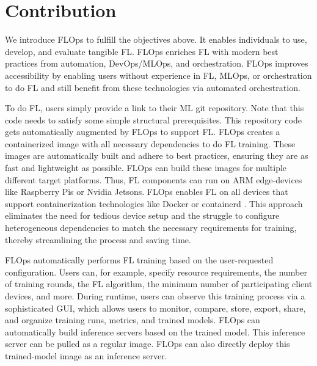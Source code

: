 
\section{Contribution}

We introduce FLOps to fulfill the objectives above.
It enables individuals to use, develop, and evaluate tangible FL.
FLOps enriches FL with modern best practices from automation, DevOps/MLOps, and orchestration.
FLOps improves accessibility by enabling users without experience in
FL, MLOps, or orchestration to do FL and still benefit from these technologies via automated orchestration.

To do FL, users simply provide a link to their ML git repository.
Note that this code needs to satisfy some simple structural prerequisites.
This repository code gets automatically augmented by FLOps to support FL.
FLOps creates a containerized image with all necessary dependencies to do FL training.
These images are automatically built and adhere to best practices, ensuring they are
as fast and lightweight as possible.
FLOps can build these images for multiple different target platforms.
Thus, FL components can run on ARM edge-devices like Raspberry Pis or Nvidia Jetsons.
FLOps enables FL on all devices that support containerization technologies
like Docker \cite{docker_docs} or containerd \cite{containerd_docs}.
This approach eliminates the need for tedious device setup and the struggle to configure
heterogeneous dependencies to match the necessary requirements for training, thereby streamlining the
process and saving time.

FLOps automatically performs FL training based on the user-requested configuration.
Users can, for example, specify resource requirements, the number of training rounds, the FL algorithm,
the minimum number of participating client devices, and more.
During runtime, users can observe this training process via a sophisticated GUI,
which allows users to monitor, compare, store, export, share, and organize training runs,
metrics, and trained models.
FLOps can automatically build inference servers based on the trained model.
This inference server can be pulled as a regular image.
FLOps can also directly deploy this trained-model image as an inference server.

